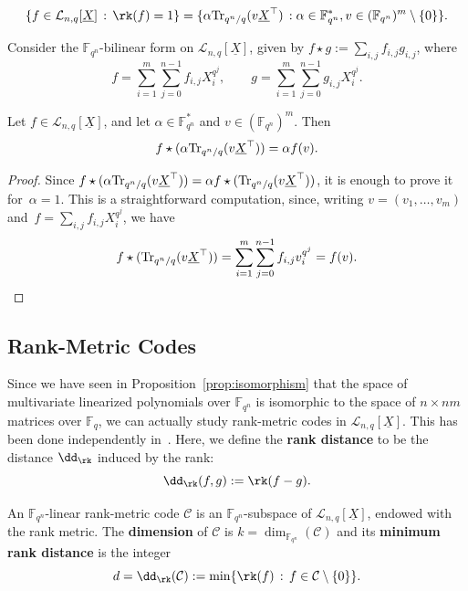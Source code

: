 \begin{lemma}\label{lem:rankone}
 $$\{f \in \mathcal{L}_{n,q}[\underline{X}] \,:\, \rk(f)=1\}=\{\alpha {\rm Tr}_{q^n/q}(v \underline{X}^\top ) \,: \alpha \in {\mathbb F}_{q^n}^*, v \in ({\mathbb F}_{q^n})^m\setminus \{0\}\}. $$
\end{lemma}

Consider the ${\mathbb F}_{q^n}$-bilinear form on $\mathcal{L}_{n,q}[\underline{X}]$, given by $f\star g:=\sum_{i,j}f_{i,j}g_{i,j}$, where
$$ f=\sum_{i=1}^m\sum_{j=0}^{n-1}f_{i,j}X_i^{q^j}, \qquad g=\sum_{i=1}^m\sum_{j=0}^{n-1}g_{i,j}X_i^{q^j}.$$

\begin{lemma}
Let $f \in \mathcal{L}_{n,q}[\underline{X}]$, and let $\alpha \in {\mathbb F}_{q^n}^*$ and $v \in ({\mathbb F}_{q^n})^m$. Then 
$$ f \star (\alpha {\rm Tr}_{q^n/q}(v \underline{X}^\top ))=\alpha f(v).$$
\end{lemma}

\begin{proof}
Since $ f \star (\alpha {\rm Tr}_{q^n/q}(v \underline{X}^\top ))=\alpha  f \star ( {\rm Tr}_{q^n/q}(v \underline{X}^\top ))$, it is enough to prove it for~$\alpha=1$. This is a straightforward computation, since, writing $v=(v_1,\ldots, v_m)$ and~$f=\sum_{i,j}f_{i,j}X_i^{q^j}$, we have 
$$  f \star ( {\rm Tr}_{q^n/q}(v \underline{X}^\top ))=\sum_{i=1}^m\sum_{j=0}^{n-1}f_{i,j}v_i^{q^j}=f(v).$$
\end{proof}

\subsection{Rank-Metric Codes}\label{Sec:2.3}
Since we have seen in Proposition~\ref{prop:isomorphism}  that the space of multivariate linearized polynomials over ${\mathbb F}_{q^n}$ is isomorphic to the space of $n\times nm$ matrices over $\mathbb{F}_q$, we can actually study rank-metric codes in $\mathcal{L}_{n,q}[\underline{X}]$. This has been done independently in~\cite{polverino2023divisible}. Here, we define the \textbf{rank distance}  to be the distance $\dd_{\rk}$ induced by the rank:
$$ \dd_{\rk}(f,g):=\rk(f-g).$$

\begin{defi}
An ${\mathbb F}_{q^n}$-linear rank-metric code $\mathcal{C}$ is an ${\mathbb F}_{q^n}$-subspace of $\mathcal{L}_{n,q}[\underline{X}]$, endowed with the rank metric. The \textbf{dimension} of $\mathcal{C}$ is $k=\dim_{{\mathbb F}_{q^n}}(\mathcal{C})$ and its \textbf{minimum rank distance} is the integer
$$d=\dd_{\rk}(\mathcal{C}):=\min\{\rk(f) \,:\, f \in \mathcal{C}\setminus\{0\}\}.$$
\end{defi}

